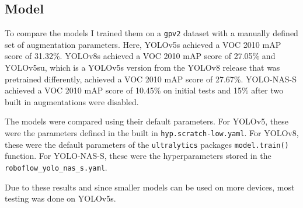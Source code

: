 \documentclass[10pt]{book}
\begin{document}
\subsection{Model}


To compare the models I trained them on a \texttt{gpv2} dataset with a manually defined set of augmentation parameters. Here, \ac{YOLO}v5s achieved a VOC 2010 \ac{mAP} score of 31.32\%. \ac{YOLO}v8s achieved a VOC 2010 \ac{mAP} score of 27.05\% and \ac{YOLO}v5su, which is a \ac{YOLO}v5s version from the \ac{YOLO}v8 release that was pretrained differently, achieved a VOC 2010 \ac{mAP} score of 27.67\%. \ac{YOLO}-NAS-S achieved a VOC 2010 \ac{mAP} score of 10.45\% on initial tests and 15\% after two built in augmentations were disabled.

The models were compared using their default parameters. For \ac{YOLO}v5, these were the parameters defined in the built in \texttt{hyp.scratch-low.yaml}. For \ac{YOLO}v8, these were the default parameters of the \texttt{ultralytics} packages \texttt{model.train()} function. For \ac{YOLO}-NAS-S, these were the hyperparameters stored in the \texttt{roboflow\_yolo\_nas\_s.yaml}.


Due to these results and since smaller models can be used on more devices, most testing was done on \ac{YOLO}v5s.
\end{document}
